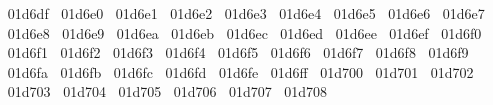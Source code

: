 {  ^^^^^^01d6df%
  ^^^^^^01d6e0%
  ^^^^^^01d6e1%
  ^^^^^^01d6e2%
  ^^^^^^01d6e3%
  ^^^^^^01d6e4%
  ^^^^^^01d6e5%
  ^^^^^^01d6e6%
  ^^^^^^01d6e7%
  ^^^^^^01d6e8%
  ^^^^^^01d6e9%
  ^^^^^^01d6ea%
  ^^^^^^01d6eb%
  ^^^^^^01d6ec%
  ^^^^^^01d6ed%
  ^^^^^^01d6ee%
  ^^^^^^01d6ef%
  ^^^^^^01d6f0%
  ^^^^^^01d6f1%
  ^^^^^^01d6f2%
  ^^^^^^01d6f3%
  ^^^^^^01d6f4%
  ^^^^^^01d6f5%
  ^^^^^^01d6f6%
  ^^^^^^01d6f7%
  ^^^^^^01d6f8%
  ^^^^^^01d6f9%
  ^^^^^^01d6fa%
  ^^^^^^01d6fb%
  ^^^^^^01d6fc%
  ^^^^^^01d6fd%
  ^^^^^^01d6fe%
  ^^^^^^01d6ff%
  ^^^^^^01d700%
  ^^^^^^01d701%
  ^^^^^^01d702%
  ^^^^^^01d703%
  ^^^^^^01d704%
  ^^^^^^01d705%
  ^^^^^^01d706%
  ^^^^^^01d707%
  ^^^^^^01d708%
}

